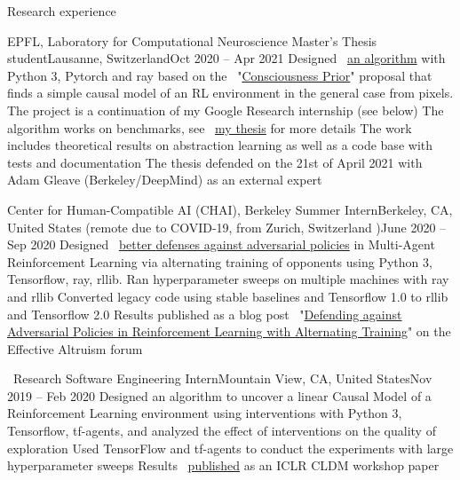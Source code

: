 \documentclass{resume} %
\newcommand*{\img}[1]{%
	\raisebox{-.02\baselineskip}{%
		\texttt{[image: \#1]}%
	}%
}
\newcommand*{\emoji}[1]{\img{./emoji/\imgpref#1.png}}
\newcommand*{\mybold}[1]{{\color{pinkunderline} #1}}
\newcommand*{\logo}[1]{%
	\raisebox{-.02\baselineskip}{%
		\texttt{[image: ./img/\\imgpref\#1]}%
	}%
}
\def\imgpref{bleak-}
\newcommand{\mylink}{{\color{gray}\faExternalLink}}
\begin{document}
\begin{rSection}{Research experience}			  
	\begin{rSubsection}{EPFL, Laboratory for Computational Neuroscience \emoji{flag-ch}}{Master's Thesis student}{Lausanne, Switzerland}{Oct 2020 -- Apr 2021}
		\myitem Designed \mylink~\href{https://github.com/sergia-ch/causality-disentanglement-rl}{an algorithm} with \mybold{Python 3, Pytorch and ray} based on the \mylink~"\href{https://arxiv.org/abs/1709.08568}{Consciousness Prior}" proposal that finds a simple causal model of an RL environment in the general case from pixels. The project is a continuation of my Google Research internship (see below)
		\myitem The algorithm works on benchmarks, see \mylink~\href{https://sergia-ch.github.io/causality-simplicity/CauseOccam_Learning_Interpretable_Abstract_Representations_in_Reinforcement_Learning_Environments_via_Model_Sparsity.pdf}{my thesis} for more details
		\myitem The work includes \mybold{theoretical results on abstraction learning as well as a code base with tests and documentation}
		\myitem The thesis defended on the 21st of April 2021 with Adam Gleave (Berkeley/DeepMind) as an external expert
	\end{rSubsection}
	
	\begin{rSubsection}{\logo{chai-logo.png} \logo{UCBerkeley.png} Center for Human-Compatible AI (CHAI), Berkeley \emoji{flag-us}}{Summer Intern}{Berkeley, CA, United States (remote due to COVID-19, from Zurich, Switzerland \emoji{flag-ch})}{June 2020 -- Sep 2020}
		\myitem Designed \mylink~\href{https://github.com/HumanCompatibleAI/better-adversarial-defenses/} {better \mybold{defenses against adversarial policies}} in Multi-Agent Reinforcement Learning via alternating training of opponents using \mybold{Python 3, Tensorflow, ray, rllib}.
		\myitem Ran hyperparameter sweeps on multiple machines with ray and rllib
		\myitem Converted legacy code using stable baselines and Tensorflow 1.0 to rllib and Tensorflow 2.0
		\myitem Results published as a blog post \mylink~"\href{https://forum.effectivealtruism.org/posts/YscrJFofd6S8eJGS8/defending-against-adversarial-policies-in-reinforcement}{Defending against Adversarial Policies in Reinforcement Learning with Alternating Training}" on the Effective Altruism forum
	\end{rSubsection}


	\begin{rSubsection}{{\large\vspace*{-0.7mm}\google}\ Research \emoji{flag-us}}{Software Engineering Intern}{Mountain View, CA, United States}{Nov 2019 -- Feb 2020}
		\myitem Designed an algorithm to uncover a linear \mybold{Causal Model} of a \mybold{Reinforcement Learning} environment using interventions with \mybold{Python 3, Tensorflow, tf-agents}, and analyzed the effect of interventions on the quality of exploration
		\myitem Used TensorFlow and tf-agents to conduct the experiments with large hyperparameter sweeps
		\myitem Results \mylink~\href{https://arxiv.org/abs/2002.05217}{published} as an ICLR CLDM workshop paper
	\end{rSubsection}


\end{rSection}
\end{document}
